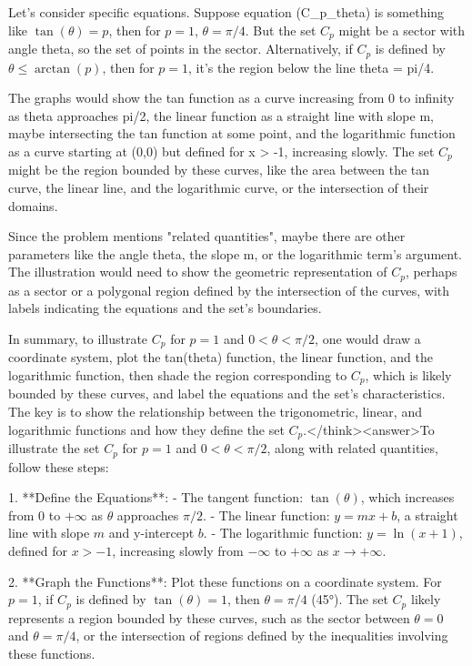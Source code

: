 Let's consider specific equations. Suppose equation (C_p_theta) is something like \( \tan(\theta) = p \), then for \( p = 1 \), \( \theta = \pi/4 \). But the set \( C_p \) might be a sector with angle theta, so the set of points in the sector. Alternatively, if \( C_p \) is defined by \( \theta \leq \arctan(p) \), then for \( p = 1 \), it's the region below the line theta = pi/4.

The graphs would show the tan function as a curve increasing from 0 to infinity as theta approaches pi/2, the linear function as a straight line with slope m, maybe intersecting the tan function at some point, and the logarithmic function as a curve starting at (0,0) but defined for x > -1, increasing slowly. The set \( C_p \) might be the region bounded by these curves, like the area between the tan curve, the linear line, and the logarithmic curve, or the intersection of their domains.

Since the problem mentions "related quantities", maybe there are other parameters like the angle theta, the slope m, or the logarithmic term's argument. The illustration would need to show the geometric representation of \( C_p \), perhaps as a sector or a polygonal region defined by the intersection of the curves, with labels indicating the equations and the set's boundaries.

In summary, to illustrate \( C_p \) for \( p = 1 \) and \( 0 < \theta < \pi/2 \), one would draw a coordinate system, plot the tan(theta) function, the linear function, and the logarithmic function, then shade the region corresponding to \( C_p \), which is likely bounded by these curves, and label the equations and the set's characteristics. The key is to show the relationship between the trigonometric, linear, and logarithmic functions and how they define the set \( C_p \).</think><answer>To illustrate the set \( C_p \) for \( p = 1 \) and \( 0 < \theta < \pi/2 \), along with related quantities, follow these steps:  

1. **Define the Equations**:  
   - The tangent function: \( \tan(\theta) \), which increases from 0 to \( +\infty \) as \( \theta \) approaches \( \pi/2 \).  
   - The linear function: \( y = mx + b \), a straight line with slope \( m \) and y-intercept \( b \).  
   - The logarithmic function: \( y = \ln(x + 1) \), defined for \( x > -1 \), increasing slowly from \( -\infty \) to \( +\infty \) as \( x \to +\infty \).  

2. **Graph the Functions**:  
   Plot these functions on a coordinate system. For \( p = 1 \), if \( C_p \) is defined by \( \tan(\theta) = 1 \), then \( \theta = \pi/4 \) (45°). The set \( C_p \) likely represents a region bounded by these curves, such as the sector between \( \theta = 0 \) and \( \theta = \pi/4 \), or the intersection of regions defined by the inequalities involving these functions.  

